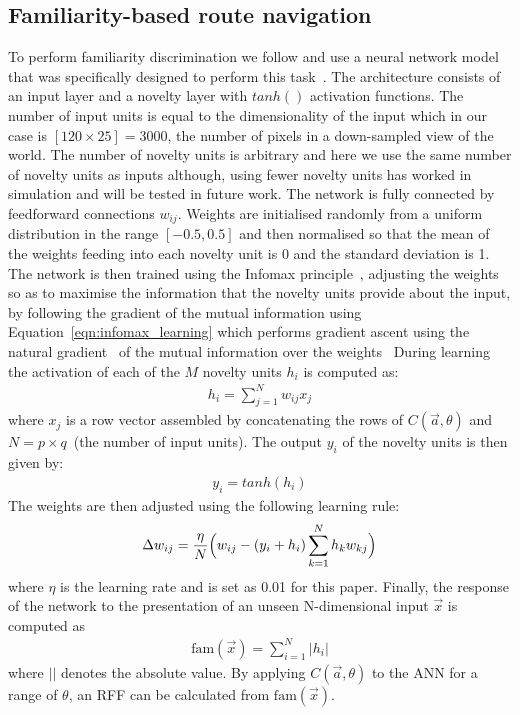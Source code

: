 \documentclass[letterpaper]{article}
\begin{document}
\subsection{Familiarity-based route navigation}
\label{sec:familiarity_infomax}
To perform familiarity discrimination we follow \citet{Baddeley2012} and use a neural network model that was specifically designed to perform this task~\citep{Lulham2011}. 
The architecture consists of an input layer and a novelty layer with $tanh()$ activation functions. 
The number of input units is equal to the dimensionality of the input which in our case is $[120 \times 25]=3000$, the number of pixels in a down-sampled view of the world. 
The number of novelty units is arbitrary and here we use the same number of novelty units as inputs although, using fewer novelty units has worked in simulation and will be tested in future work.
The network is fully connected by feedforward connections $w_{ij}$. 
Weights are initialised randomly from a uniform distribution in the range $[-0.5,0.5]$ and then normalised so that the mean of the weights feeding into each novelty unit is \num{0} and the standard deviation is \num{1}. 
The network is then trained using the Infomax principle~\citep{Bell1995}, adjusting the weights so as to maximise the information that the novelty units provide about the input, by following the gradient of the mutual information using Equation~\ref{eqn:infomax_learning} which performs gradient ascent using the natural gradient~\citep{Amari1998} of the mutual information over the weights~\citep{Lee1997}
During learning the activation of each of the $M$ novelty units $h_{i}$ is computed as:
%
\begin{align}
    h_{i}=\sum\limits_{j=1}^N w_{ij}x_{j}   \label{eqn:infomax_activation}
\end{align}
%
where $x_{j}$ is a row vector assembled by concatenating the rows of $C(\vec{a}, \theta)$ and $N=p \times q$~(the number of input units).
The output $y_{i}$ of the novelty units is then given by:
%
\begin{align}
    y_{i}=tanh(h_{i})   \label{eqn:infomax_output}
\end{align}
%
The weights are then adjusted using the following learning rule: 
%
\begin{align}
    \Delta w_{ij}=\frac{\eta}{N} \Bigl( w_{ij} - (y_{i} + h_{i}) \sum\limits_{k=1}^N h_{k}w_{kj} \Bigr)   \label{eqn:infomax_learning}
\end{align}
%
where $\eta$ is the learning rate and is set as \num{0.01} for this paper. 
Finally, the response of the network to the presentation of an unseen N-dimensional input $\vec{x}$ is computed as
%
\begin{align}
    \text{fam}(\vec{x})=\sum\limits_{i=1}^N |h_{i}|     \label{eqn:infomax_response}
\end{align}
%
where $||$ denotes the absolute value.
By applying $C(\vec{a}, \theta)$ to the ANN for a range of $\theta$, an RFF can be calculated from $\text{fam}(\vec{x})$.
\end{document}

